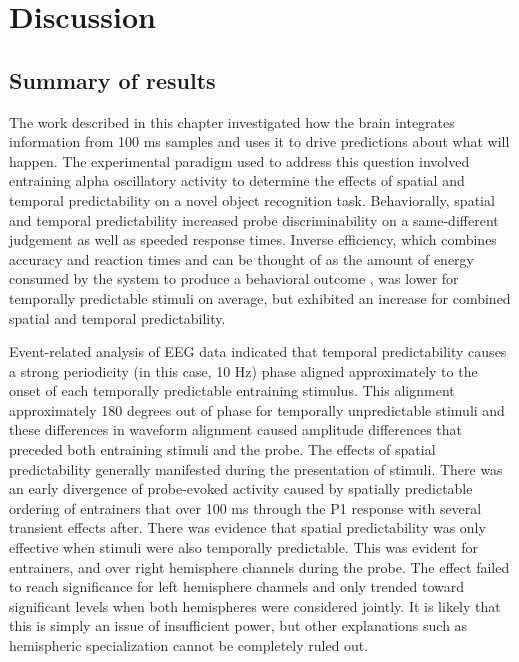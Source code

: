 \documentclass[dwyatte_dissertation.tex]{subfiles}
\begin{document}

\section{Discussion}

\subsection{Summary of results}

The work described in this chapter investigated how the brain integrates information from 100 ms samples and uses it to drive predictions about what will happen. The experimental paradigm used to address this question involved entraining alpha oscillatory activity to determine the effects of spatial and temporal predictability on a novel object recognition task. Behaviorally, spatial and temporal predictability increased probe discriminability on a same-different judgement as well as speeded response times. Inverse efficiency, which combines accuracy and reaction times and can be thought of as the amount of energy consumed by the system to produce a behavioral outcome \cite{TownshendAshby78,TownshendAshby83}, was lower for temporally predictable stimuli on average, but exhibited an increase for combined spatial and temporal predictability.

Event-related analysis of EEG data indicated that temporal predictability causes a strong periodicity (in this case, 10 Hz) phase aligned approximately to the onset of each temporally predictable entraining stimulus. This alignment approximately 180 degrees out of phase for temporally unpredictable stimuli and these differences in waveform alignment caused amplitude differences that preceded both entraining stimuli and the probe. The effects of spatial predictability generally manifested during the presentation of stimuli. There was an early divergence of probe-evoked activity caused by spatially predictable ordering of entrainers that over 100 ms through the P1 response with several transient effects after. There was evidence that spatial predictability was only effective when stimuli were also temporally predictable. This was evident for entrainers, and over right hemisphere channels during the probe. The effect failed to reach significance for left hemisphere channels and only trended toward significant levels when both hemispheres were considered jointly. It is likely that this is simply an issue of insufficient power, but other explanations such as hemispheric specialization \cite[e.g.,]{Dien09b} cannot be completely ruled out.
\end{document}
